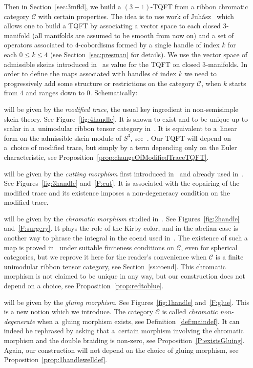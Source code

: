 \documentclass[10pt,a4paper]{amsart}
\numberwithin{equation}{section}
\numberwithin{theorem}{section}
\numberwithin{proposition}{section}
\numberwithin{definition}{section}
\numberwithin{lemma}{section}
\numberwithin{corollary}{section}
\numberwithin{remark}{section}
\numberwithin{example}{section}
\newcommand{\cat}{\mathcal{C}}
\begin{document}
 Then in Section~\ref{sec:3mfld}, we build a $(3+1)$-TQFT from
a ribbon chromatic category $\cat$ with certain properties.
The idea is to use work of Juh\'asz~\cite{Juh2018} which allows one to build a TQFT by associating a vector space to each closed $3$-manifold (all manifolds are
assumed to be
smooth from now on) and a set of operators associated to $4$-cobordisms formed by a single handle of index $k$ for each $0\leq k \leq 4$ (see Section~\ref{sec:presman} for details).
We use the vector space of admissible skeins introduced in~\cite{CGP22} as value for the TQFT on closed $3$-manifolds. In order to define the maps associated
with
 handles of index $k$ we need to progressively add some structure or restrictions on the category $\cat$, when $k$ starts from $4$ and ranges down to $0$. Schematically:
\begin{description}\itemsep=0pt
\item[The 4-handle] will be given by the \emph{modified trace}, the usual key ingredient in non-semisimple skein theory. See Figure~\ref{fig:4handle}. It is shown to exist and to be unique up to scalar in a~unimodular ribbon tensor category in~\cite[Corollary 5.6]{GKP22}. It is equivalent to a~linear form on the admissible skein module of $S^3$, see~\cite[Theorem~3.1]{CGP22}. Our TQFT will depend on a~choice of modified trace, but simply by a term depending only on the Euler characteristic, see Proposition~\ref{prop:changeOfModifiedTraceTQFT}.
\item[The 3-handle] will be given by the \emph{cutting morphism} first introduced in~\cite{CGPT20} and already used in~\cite{CGPV2023a}. See Figures~\ref{fig:3handle} and~\ref{F:cut}. It is associated with the copairing of the modified trace and its existence imposes a non-degeneracy condition on the modified trace.
\item[The 2-handle] will be given by the \emph{chromatic morphism} studied in~\cite{CGPV2023b}. See Figures~\ref{fig:2handle} and~\ref{F:surgery}. It plays the role of the Kirby color, and in the abelian case is another way to phrase the integral in the coend used in~\cite{DRGGPMR2022}. The existence of such a map is proved in~\cite{CGPV2023b} under suitable finiteness conditions on $\cat$, even for spherical categories, but we reprove it here for the reader's convenience when $\cat$ is a finite unimodular ribbon tensor category, see Section~\ref{ss:coend}. This chromatic morphism is not claimed to be unique in any way, but our construction does not depend on a choice, see Proposition~\ref{prop:redtoblue}.
\item[The 1-handle] will be given by the \emph{gluing morphism}. See Figures~\ref{fig:1handle} and~\ref{F:glue}. This is a new notion which we introduce. The category $\cat$ is called \emph{chromatic non-degenerate} when a~gluing morphism exists, see Definition~\ref{def:maindef}. It can indeed be rephrased by asking that a~certain morphism involving the chromatic morphism and the double braiding is non-zero, see Proposition~\ref{P:existsGluing}. Again, our construction will not depend on the choice of gluing morphism, see Proposition~\ref{prop:1handlewelldef}.

\end{description}
\end{document}
